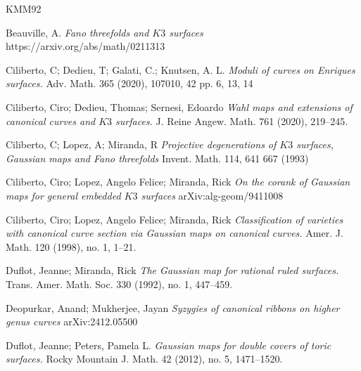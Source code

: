 \documentclass[11pt,twoside]{amsart}
\theoremstyle{plain}
\numberwithin{equation}{section}
\theoremstyle{definition}
\begin{document}
\begin{thebibliography}{KMM92}



Beauville, A. \emph{Fano threefolds and $K3$ surfaces}
https://arxiv.org/abs/math/0211313

Ciliberto, C; Dedieu, T;  Galati, C.; Knutsen, A. L.  
\emph{Moduli of curves on Enriques surfaces.}
Adv. Math. 365 (2020), 107010, 42 pp. 6, 13, 14

Ciliberto, Ciro; Dedieu, Thomas; Sernesi, Edoardo
\emph{Wahl maps and extensions of canonical curves and $K3$ surfaces.}
J. Reine Angew. Math. 761 (2020), 219–245.

Ciliberto, C; Lopez, A; Miranda, R
\emph{Projective degenerations of $K3$ surfaces, Gaussian maps and Fano threefolds}
Invent. Math. 114, 641 667 (1993)

Ciliberto, Ciro; Lopez, Angelo Felice; Miranda, Rick
\emph{On the corank of Gaussian maps for general embedded $K3$ surfaces}
arXiv:alg-geom/9411008

Ciliberto, Ciro; Lopez, Angelo Felice; Miranda, Rick
\emph{Classification of varieties with canonical curve section via Gaussian maps on canonical curves.}
Amer. J. Math.   120 (1998), no. 1, 1–21.

Duflot, Jeanne; Miranda, Rick
\emph{The Gaussian map for rational ruled surfaces.}
Trans. Amer. Math. Soc. 330 (1992), no. 1, 447–459.

Deopurkar, Anand; Mukherjee, Jayan
\emph{Syzygies of canonical ribbons on higher genus curves}
arXiv:2412.05500


Duflot, Jeanne; Peters, Pamela L.
\emph{Gaussian maps for double covers of toric surfaces.}
Rocky Mountain J. Math. 42 (2012), no. 5, 1471–1520.













\end{thebibliography}
\end{document}
